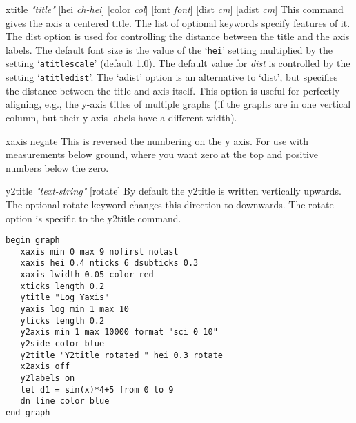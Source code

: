 \begin{commanddescription}
\item[{\sf xtitle {\it "title"}  [hei {\it ch-hei}]  [color {\it col}] [font {\it font}] [dist {\it cm}] [adist {\it cm}]}]
This command gives the axis a centered title.  The list of optional keywords specify features of it.  The {\sf dist} option is used for controlling the distance between the title and the axis labels. The default font size is the value of the `\texttt{hei}' setting multiplied by the setting `\texttt{atitlescale}' (default 1.0). The default value for {\it dist} is controlled by the setting `\texttt{atitledist}'. The `{\sf adist}' option is an alternative to `{\sf dist}', but specifies the distance between the title and axis itself. This option is useful for perfectly aligning, e.g., the y-axis titles of multiple graphs (if the graphs are in one vertical column, but their y-axis labels have a different width).

\item[{\sf xaxis negate}  ]
This is reversed the numbering on the y axis.  For use with
measurements below ground, where you want zero at the top and
positive numbers below the zero.

\item[{\sf y2title {\it "text-string"}  [rotate]  }  ]
By default the y2title is written vertically upwards.  The optional
{\sf rotate} keyword changes this direction to downwards.  The {\sf rotate} option
is specific to the {\sf y2title} command.

\begin{minipage}[c]{8cm}
\begin{Verbatim}
begin graph
   xaxis min 0 max 9 nofirst nolast
   xaxis hei 0.4 nticks 6 dsubticks 0.3
   xaxis lwidth 0.05 color red
   xticks length 0.2
   ytitle "Log Yaxis"
   yaxis log min 1 max 10
   yticks length 0.2
   y2axis min 1 max 10000 format "sci 0 10"
   y2side color blue
   y2title "Y2title rotated " hei 0.3 rotate
   x2axis off
   y2labels on
   let d1 = sin(x)*4+5 from 0 to 9 
   dn line color blue
end graph
\end{Verbatim}
\end{minipage}
\hfill
\begin{minipage}[c]{7cm}
\mbox{}
\end{minipage}

\end{commanddescription}

